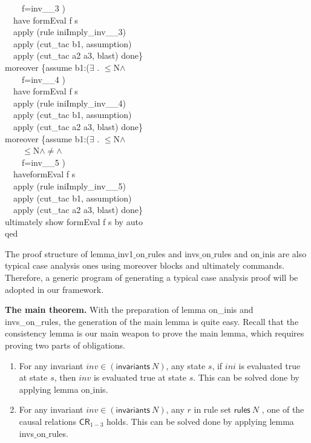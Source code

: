 \begin{specification}
~~~~f=inv\_\_3   )\\
~~have formEval f s\\
~~apply (rule iniImply\_inv\_\_3)\\
~~apply (cut\_tac b1, assumption)\\
~~apply (cut\_tac a2 a3, blast) done\}\\
moreover \{assume b1:($\exists$ . $\le$N$\wedge$\\
~~~~f=inv\_\_4  )\\
~~have formEval f s\\
~~apply (rule iniImply\_inv\_\_4)\\
~~apply (cut\_tac b1, assumption)\\
~~apply (cut\_tac a2 a3, blast) done\}\\
moreover \{assume b1:($\exists$  . $\le$N$\wedge$ \\
~~~~$\le$N$\wedge$$\neq$$\wedge$\\
~~~~f=inv\_\_5   )\\
~~haveformEval f s\\
~~apply (rule iniImply\_inv\_\_5)\\
~~apply (cut\_tac b1, assumption)\\
~~apply (cut\_tac a2 a3, blast) done\}\\
ultimately show formEval f s by auto\\
qed\\
\end{specification}

The proof structure of {\sf lemma$\_$inv1$\_$on$\_$rules} and
{\sf invs$\_$on$\_$rules} and {\sf on$\_$inis} are also typical case analysis ones
using {\sf moreover} blocks and {\sf ultimately} commands.
Therefore, a generic program of generating a typical case analysis proof will be adopted in our framework.

\medskip\noindent
{\bf The main theorem.}
With the preparation of lemma on\_inis and invs\_on\_rules,
the generation of the main lemma is quite easy.
Recall that the consistency lemma is our main weapon to prove the main lemma,
which requires proving two parts of obligations.

\begin{enumerate}
\item For any invariant $inv \in (\mathsf{invariants} ~N) $,  any
state $s$, if $ini$ is evaluated true at state $s$, then $inv$ is
evaluated true at state $s$. This can be solved done by applying lemma on$\_$inis.
\item For any invariant $inv \in (\mathsf{invariants} ~N)$, any $r$ in rule set
$ \mathsf{rules} ~N$ , one of the causal relations
$\mathsf{CR}_{1-3}$ holds. This can be solved done by  applying lemma invs$\_$on$\_$rules.
\end{enumerate}

